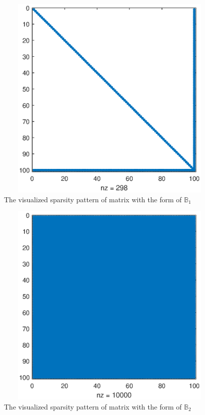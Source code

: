 \documentclass[UTF8,a4paper,10pt]{ctexart}
\begin{document}
\begin{figure}[ht]
    \centering
    \includegraphics[width=14cm,height=10cm]{1.2_spy_B1.eps}
    \caption{The visualized sparsity pattern of matrix with the form of $\mathbb{B}_1$}
\end{figure}
\begin{figure}[ht]
    \centering
    \includegraphics[width=14cm,height=10cm]{1.2_spy_B2.eps}
    \caption{The visualized sparsity pattern of matrix with the form of $\mathbb{B}_2$}
\end{figure}
\end{document}
